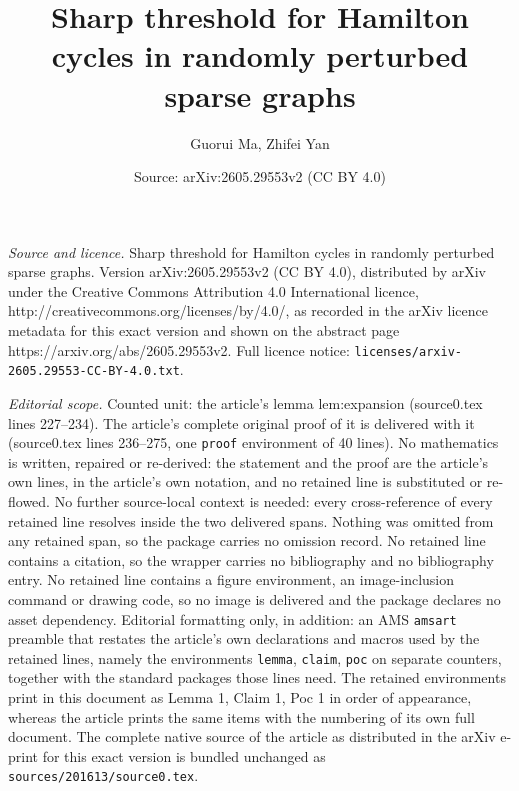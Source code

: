 \documentclass[10pt,a4paper]{amsart}
\title{Sharp threshold for Hamilton cycles in randomly perturbed sparse graphs}
\author{Guorui Ma, Zhifei Yan}
\date{Source: arXiv:2605.29553v2 (CC BY 4.0)}
\begin{document}
\maketitle

\noindent\emph{Source and licence.} Sharp threshold for Hamilton cycles in randomly perturbed sparse graphs. Version arXiv:2605.29553v2 (CC BY 4.0), distributed by arXiv under the Creative Commons Attribution 4.0 International licence, http://creativecommons.org/licenses/by/4.0/, as recorded in the arXiv licence metadata for this exact version and shown on the abstract page https://arxiv.org/abs/2605.29553v2. Full licence notice: \texttt{licenses/arxiv-2605.29553-CC-BY-4.0.txt}.\par\smallskip

\noindent\textit{Editorial scope.} Counted unit: the article's lemma lem:expansion (source0.tex lines 227--234). The article's complete original proof of it is delivered with it (source0.tex lines 236--275, one \texttt{proof} environment of 40 lines). No mathematics is written, repaired or re-derived: the statement and the proof are the article's own lines, in the article's own notation, and no retained line is substituted or re-flowed.  No further source-local context is needed: every cross-reference of every retained line resolves inside the two delivered spans.  Nothing was omitted from any retained span, so the package carries no omission record.  No retained line contains a citation, so the wrapper carries no bibliography and no bibliography entry.  No retained line contains a figure environment, an image-inclusion command or drawing code, so no image is delivered and the package declares no asset dependency.  Editorial formatting only, in addition: an AMS \texttt{amsart} preamble that restates the article's own declarations and macros used by the retained lines, namely the environments \texttt{lemma}, \texttt{claim}, \texttt{poc} on separate counters, together with the standard packages those lines need.  The retained environments print in this document as Lemma 1, Claim 1, Poc 1 in order of appearance, whereas the article prints the same items with the numbering of its own full document.  The complete native source of the article as distributed in the arXiv e-print for this exact version is bundled unchanged as \texttt{sources/201613/source0.tex}.
\end{document}

